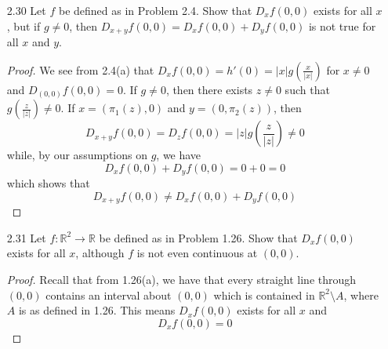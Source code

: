 \begin{enumerate}
\begin{proof}
\begin{enumerate}
        \item Let \( f \) be differentiable at \( a \). If \( g(t) = a+tx \) then 
        \begin{align*}
        D_xf(a) &= \lim_{t \rightarrow 0} \frac{f(a+tx)-f(a)}{t} \\
        &= \lim_{t \rightarrow 0} \frac{(f\circ g)(t)-(f \circ g)(0)}{t} \\
        &= D(f\circ g)(0) \\
        &= Df(g(0)) \circ Dg(0) \\
        &= Df(a)(x)
        \end{align*}
        By linearity of \( Df(a) \) we get the desired result.
    \end{enumerate}
    \end{proof}

    \item[2.30] Let \( f \) be defined as in Problem 2.4. Show that \( D_xf(0,0) \) exists for all \( x \), but if \( g \neq 0 \), then \( D_{x+y}f(0,0) = D_xf(0,0) + D_yf(0,0) \) is not true for all \( x \) and \( y \). 
    
    \begin{proof}
    We see from 2.4(a) that \( D_xf(0,0) = h'(0) = \left| x \right| g\left( \frac{x}{\left|x \right|} \right)\) for \( x \neq 0 \) and \( D_{(0,0)}f(0,0) = 0 \). If \( g \neq 0 \), then there exists \( z \neq 0 \) such that \linebreak \( g\left( \frac{z}{\left| z \right|} \right) \neq 0 \). If \( x = (\pi_1(z),0) \) and \( y = (0,\pi_2(z)) \), then
    \[
    D_{x+y}f(0,0) = D_{z}f(0,0) = \left| z \right| g\left( \frac{z}{\left| z \right|} \right) \neq 0
    \]
    while, by our assumptions on \( g \), we have
    \[
    D_xf(0,0) + D_yf(0,0) = 0 + 0 = 0
    \]
    which shows that 
    \[
    D_{x+y}f(0,0) \neq D_xf(0,0) + D_yf(0,0)
    \]
    \end{proof}
    
    \item[2.31] Let \( f: \mathbb{R}^2 \rightarrow \mathbb{R} \) be defined as in Problem 1.26. Show that \( D_xf(0,0) \) exists for all \( x \), although \( f \) is not even continuous at \( (0,0) \). 
    
    \begin{proof}
    Recall that from 1.26(a), we have that every straight line through \( (0,0) \) contains an interval about \( (0,0) \) which is contained in \( \mathbb{R}^2\setminus A \), where \( A \) is as defined in 1.26. This means \( D_xf(0,0) \) exists for all \( x \) and
    \[
    D_xf(0,0) = 0
    \]
    \end{proof}
    

\end{enumerate}
